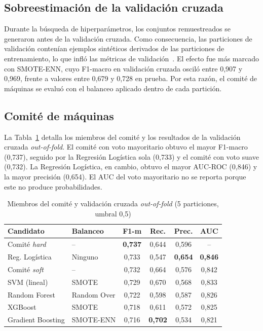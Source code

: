 \documentclass[conference]{IEEEtran}
\begin{document}
\subsection{Sobreestimación de la validación cruzada}

Durante la búsqueda de hiperparámetros, los conjuntos remuestreados se generaron antes de la validación cruzada. Como consecuencia, las particiones de validación contenían ejemplos sintéticos derivados de las particiones de entrenamiento, lo que infló las métricas de validación~\cite{cawley2010overfitting}. El efecto fue más marcado con SMOTE-ENN, cuyo F1-macro en validación cruzada osciló entre 0,907 y 0,969, frente a valores entre 0,679 y 0,728 en prueba. Por esta razón, el comité de máquinas se evaluó con el balanceo aplicado dentro de cada partición.

\subsection{Comité de máquinas}

La Tabla~\ref{tab:comite} detalla los miembros del comité y los resultados de la validación cruzada \emph{out-of-fold}. El comité con voto mayoritario obtuvo el mayor F1-macro (0,737), seguido por la Regresión Logística sola (0,733) y el comité con voto suave (0,732). La Regresión Logística, en cambio, obtuvo el mayor AUC-ROC (0,846) y la mayor precisión (0,654). El AUC del voto mayoritario no se reporta porque este no produce probabilidades.

\begin{table}[!t]
\caption{Miembros del comité y validación cruzada \emph{out-of-fold} (5 particiones, umbral 0,5)}
\label{tab:comite}
\centering
\footnotesize
\setlength{\tabcolsep}{3pt}
\begin{tabular}{@{}llcccc@{}}
\toprule
Candidato & Balanceo & F1-m & Rec. & Prec. & AUC \\
\midrule
Comité \emph{hard} & -- & \textbf{0,737} & 0,644 & 0,596 & -- \\
Reg. Logística & Ninguno & 0,733 & 0,547 & \textbf{0,654} & \textbf{0,846} \\
Comité \emph{soft} & -- & 0,732 & 0,664 & 0,576 & 0,842 \\
SVM (lineal) & SMOTE & 0,729 & 0,670 & 0,568 & 0,833 \\
Random Forest & Random Over & 0,722 & 0,598 & 0,587 & 0,826 \\
XGBoost & SMOTE & 0,718 & 0,611 & 0,572 & 0,825 \\
Gradient Boosting & SMOTE-ENN & 0,716 & \textbf{0,702} & 0,534 & 0,821 \\
\bottomrule
\end{tabular}
\end{table}
\end{document}
